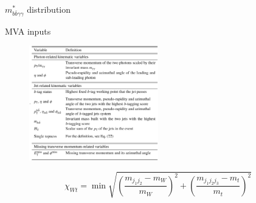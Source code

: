 \begin{frame}{$m_{b\bar{b}\gamma\gamma}^*$ distribution}
\begin{figure}
    \centering
\end{figure}    
\end{frame}

\begin{frame}{MVA inputs}

\begin{figure}
    \centering
    \includegraphics[width=0.5\textwidth]{BackUp/Part3/Img/BDT_inputs.png}
\end{figure}

\begin{equation*}
    \chi_{W t}=\min \sqrt{\left(\frac{m_{j_{1} j_{2}}-m_{W}}{m_{W}}\right)^{2}+\left(\frac{m_{j_{1} j_{2} j_{3}}-m_{t}}{m_{t}}\right)^{2}}
\end{equation*}
\end{frame}

